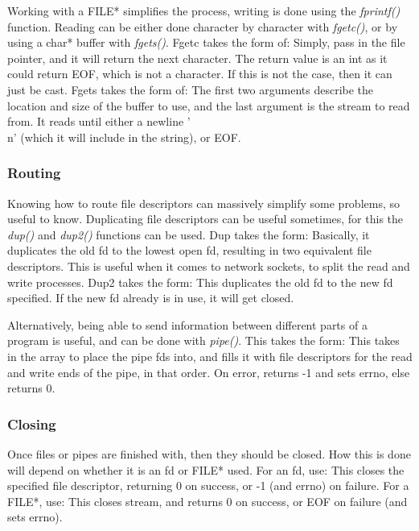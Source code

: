 \documentclass{article}
\begin{document}
Working with a FILE* simplifies the process, writing is done using the \textit{fprintf()} function. Reading can be either done character by character with \textit{fgetc()}, or by using a char* buffer with \textit{fgets()}. Fgetc takes the form of:
Simply, pass in the file pointer, and it will return the next character. The return value is an int as it could return EOF, which is not a character. If this is not the case, then it can just be cast. Fgets takes the form of:
The first two arguments describe the location and size of the buffer to use, and the last argument is the stream to read from. It reads until either a newline '\\n' (which it will include in the string), or EOF.

\subsubsection{Routing}
Knowing how to route file descriptors can massively simplify some problems, so useful to know. Duplicating file descriptors can be useful sometimes, for this the \textit{dup()} and \textit{dup2()} functions can be used. Dup takes the form:
Basically, it duplicates the old fd to the lowest open fd, resulting in two equivalent file descriptors. This is useful when it comes to network sockets, to split the read and write processes. Dup2 takes the form:
This duplicates the old fd to the new fd specified. If the new fd already is in use, it will get closed.

Alternatively, being able to send information between different parts of a program is useful, and can be done with \textit{pipe()}. This takes the form:
This takes in the array to place the pipe fds into, and fills it with file descriptors for the read and write ends of the pipe, in that order. On error, returns -1 and sets errno, else returns 0.

\subsubsection{Closing}
Once files or pipes are finished with, then they should be closed. How this is done will depend on whether it is an fd or FILE* used. For an fd, use:
This closes the specified file descriptor, returning 0 on success, or -1 (and errno) on failure. For a FILE*, use:
This closes stream, and returns 0 on success, or EOF on failure (and sets errno).
\end{document}
